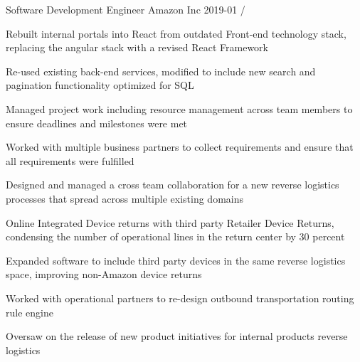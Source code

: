 \documentclass[11pt, a4paper]{awesomecv}
\begin{document}
\begin{cventries}
 
  \cventry
    {Software Development Engineer}
    {Amazon Inc}
    {}
    {2019-01 / }
    {
          \begin{cvitems}
                    \item{Rebuilt internal portals into React from outdated Front-end technology stack, replacing the angular stack with a revised React Framework}
                    \item{Re-used existing back-end services, modified to include new search and pagination functionality optimized for SQL}
                    \item{Managed project work including resource management across team members to ensure deadlines and milestones were met}
                    \item{Worked with multiple business partners to collect requirements and ensure that all requirements were fulfilled}
                    \item{Designed and managed a cross team collaboration for a new reverse logistics processes that spread across multiple existing domains}
                    \item{Online Integrated Device returns with third party Retailer Device Returns, condensing the number of operational lines in the return center by 30 percent}
                    \item{Expanded software to include third party devices in the same reverse logistics space, improving non-Amazon device returns}
                    \item{Worked with operational partners to re-design outbound transportation routing rule engine}
                    \item{Oversaw on the release of new product initiatives for internal products reverse logistics}

\end{cvitems}}
\end{cventries}
\end{document}

